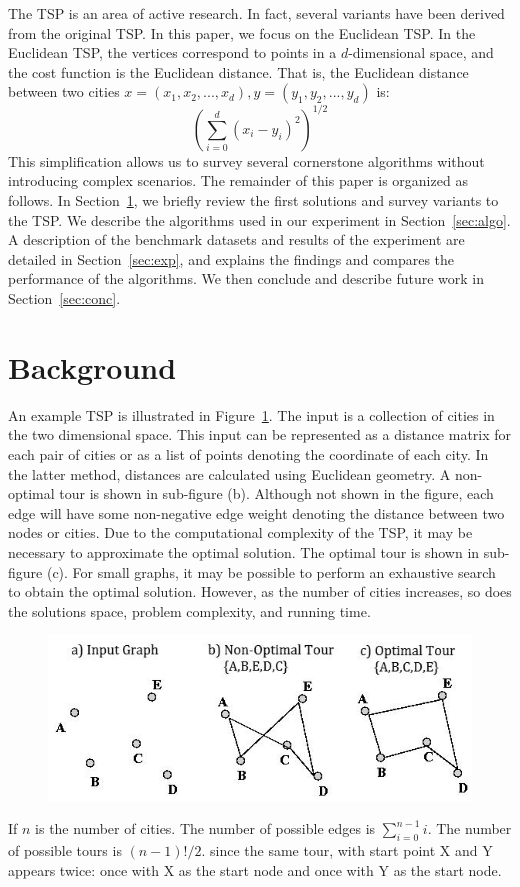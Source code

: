 \documentclass[10pt,twocolumn,letterpaper]{article}
\begin{document}
The TSP is an area of active research. In fact, several
variants have been derived from the original TSP. In this
paper, we focus on the Euclidean TSP. In the Euclidean TSP, the vertices correspond to points in a $d$-dimensional
space, and the cost function is the Euclidean distance. That is, the Euclidean distance between two cities $x = (x_1, x_2, ..., x_d)
, y = (y_1, y_2, ..., y_d)$ is:
\begin{equation}
	(\sum_{i=0}^{d}(x_i-y_i)^2)^{1/2}
\end{equation}
This simplification allows us to survey several cornerstone algorithms without introducing complex scenarios. The remainder of this paper is organized
as follows. In Section~\ref{sec:background}, we briefly review the first solutions and survey variants to the TSP. We
describe the algorithms used in our experiment in Section~\ref{sec:algo}. A description of
the benchmark datasets and results of the experiment are
detailed in Section~\ref{sec:exp}, and explains the
findings and compares the performance of the algorithms.
We then conclude and describe future work in Section~\ref{sec:conc}.

\section{Background}\label{sec:background}
An example TSP is illustrated in Figure~\ref{fig:egtsp}. The input is a collection of cities in the two dimensional space. This input can be represented as a distance matrix for each pair of cities or as a list of points
denoting the coordinate of each city. In the latter method,
distances are calculated using Euclidean geometry. A non-optimal tour is shown in sub-figure (b). Although not shown in the figure, each edge will have some non-negative edge
weight denoting the distance between two nodes or cities.
Due to the computational complexity of the TSP, it may be
necessary to approximate the optimal solution. The optimal
tour is shown in sub-figure (c). For small graphs, it may be
possible to perform an exhaustive search to obtain the optimal solution. However, as the number of cities increases, so
does the solutions space, problem complexity, and running
time.

\begin{figure}
\centering
\includegraphics[width=.7\linewidth]{egtsp}
\caption{}
\label{fig:egtsp}
\end{figure}
If $n$ is the number of cities. The number of possible edges is $\sum_{i=0}^{n-1}i$. The number of possible tours is $(n - 1)!/2$. since the same tour, with start point
X and Y appears twice: once with X as the start node and
once with Y as the start node.
\end{document}
